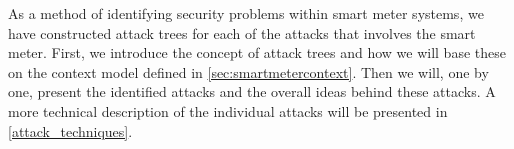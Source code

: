 
As a method of identifying security problems within smart meter systems, we have constructed attack trees for each of the attacks that involves the smart meter.
First, we introduce the concept of attack trees and how we will base these on the context model defined in \cref{sec:smartmetercontext}.
Then we will, one by one, present the identified attacks and the overall ideas behind these attacks.
A more technical description of the individual attacks will be presented in \cref{attack_techniques}.
